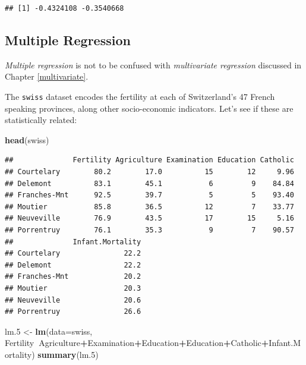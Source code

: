 \documentclass[]{book}
\newenvironment{Shaded}{\begin{snugshade}}{\end{snugshade}}
\newcommand{\KeywordTok}[1]{\textcolor[rgb]{0.13,0.29,0.53}{\textbf{#1}}}
\newcommand{\DataTypeTok}[1]{\textcolor[rgb]{0.13,0.29,0.53}{#1}}
\newcommand{\DecValTok}[1]{\textcolor[rgb]{0.00,0.00,0.81}{#1}}
\newcommand{\StringTok}[1]{\textcolor[rgb]{0.31,0.60,0.02}{#1}}
\newcommand{\OperatorTok}[1]{\textcolor[rgb]{0.81,0.36,0.00}{\textbf{#1}}}
\newcommand{\NormalTok}[1]{#1}
\theoremstyle{definition}
\theoremstyle{definition}
\theoremstyle{definition}
\theoremstyle{remark}
\let\BeginKnitrBlock\begin \let\EndKnitrBlock\end
\begin{document}
\begin{verbatim}
## [1] -0.4324108 -0.3540668
\end{verbatim}

\subsection{Multiple Regression}\label{multiple-regression}

\BeginKnitrBlock{remark}
{}\emph{Multiple regression} is not to be
confused with \emph{multivariate regression} discussed in Chapter
\ref{multivariate}.
\EndKnitrBlock{remark}

The \texttt{swiss} dataset encodes the fertility at each of
Switzerland's 47 French speaking provinces, along other socio-economic
indicators. Let's see if these are statistically related:

\begin{Shaded}
\begin{Highlighting}[]
\KeywordTok{head}\NormalTok{(swiss)}
\end{Highlighting}
\end{Shaded}

\begin{verbatim}
##              Fertility Agriculture Examination Education Catholic
## Courtelary        80.2        17.0          15        12     9.96
## Delemont          83.1        45.1           6         9    84.84
## Franches-Mnt      92.5        39.7           5         5    93.40
## Moutier           85.8        36.5          12         7    33.77
## Neuveville        76.9        43.5          17        15     5.16
## Porrentruy        76.1        35.3           9         7    90.57
##              Infant.Mortality
## Courtelary               22.2
## Delemont                 22.2
## Franches-Mnt             20.2
## Moutier                  20.3
## Neuveville               20.6
## Porrentruy               26.6
\end{verbatim}

\begin{Shaded}
\begin{Highlighting}[]
\NormalTok{lm.}\DecValTok{5}\NormalTok{ <-}\StringTok{ }\KeywordTok{lm}\NormalTok{(}\DataTypeTok{data=}\NormalTok{swiss, Fertility}\OperatorTok{~}\NormalTok{Agriculture}\OperatorTok{+}\NormalTok{Examination}\OperatorTok{+}\NormalTok{Education}\OperatorTok{+}\NormalTok{Education}\OperatorTok{+}\NormalTok{Catholic}\OperatorTok{+}\NormalTok{Infant.Mortality)}
\KeywordTok{summary}\NormalTok{(lm.}\DecValTok{5}\NormalTok{)}
\end{Highlighting}
\end{Shaded}
\end{document}
